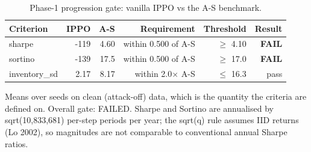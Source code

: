 \begin{table}[htbp]
  \centering
  \caption{Phase-1 progression gate: vanilla IPPO vs the A-S benchmark.}
  \label{tab:gate}
  \begin{tabular}{lrrrrr}
    \toprule
    Criterion & IPPO & A-S & Requirement & Threshold & Result \\
    \midrule
    sharpe & -119 & 4.60 & within 0.500 of A-S & $\geq$ 4.10 & \textbf{FAIL} \\
    sortino & -139 & 17.5 & within 0.500 of A-S & $\geq$ 17.0 & \textbf{FAIL} \\
    inventory\_sd & 2.17 & 8.17 & within 2.0$\times$ A-S & $\leq$ 16.3 & pass \\
    \bottomrule
  \end{tabular}
  \begin{minipage}{\linewidth}\vspace{4pt}\footnotesize Means over seeds on clean (attack-off) data, which is the quantity the criteria are defined on. Overall gate: FAILED. Sharpe and Sortino are annualised by sqrt(10,833,681) per-step periods per year; the sqrt(q) rule assumes IID returns (Lo 2002), so magnitudes are not comparable to conventional annual Sharpe ratios.\end{minipage}
\end{table}
